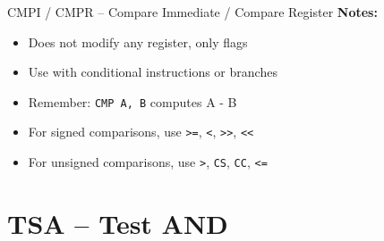 \begin{instructionbox}{CMPI / CMPR -- Compare Immediate / Compare Register}
	\textbf{Notes:}
	\begin{itemize}
		\item Does not modify any register, only flags
		\item Use with conditional instructions or branches
		\item Remember: \texttt{CMP A, B} computes A - B
		\item For signed comparisons, use \texttt{>=}, \texttt{<}, \texttt{>>}, \texttt{<<}
		\item For unsigned comparisons, use \texttt{>}, \texttt{CS}, \texttt{CC}, \texttt{<=}
	\end{itemize}
\end{instructionbox}

\section{TSA -- Test AND}

